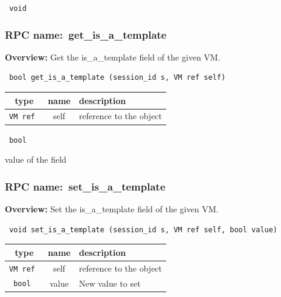 \vspace{0.3cm}

{\tt 
void
}



\vspace{0.3cm}
\vspace{0.3cm}
\vspace{0.3cm}
\subsubsection{RPC name:~get\_is\_a\_template}

{\bf Overview:} 
Get the is\_a\_template field of the given VM.

\begin{verbatim} bool get_is_a_template (session_id s, VM ref self)\end{verbatim}



 
\vspace{0.3cm}
\begin{tabular}{|c|c|p{7cm}|}
 \hline
{\bf type} & {\bf name} & {\bf description} \\ \hline
{\tt VM ref } & self & reference to the object \\ \hline 

\end{tabular}

\vspace{0.3cm}

{\tt 
bool
}


value of the field
\vspace{0.3cm}
\vspace{0.3cm}
\vspace{0.3cm}
\subsubsection{RPC name:~set\_is\_a\_template}

{\bf Overview:} 
Set the is\_a\_template field of the given VM.

\begin{verbatim} void set_is_a_template (session_id s, VM ref self, bool value)\end{verbatim}



 
\vspace{0.3cm}
\begin{tabular}{|c|c|p{7cm}|}
 \hline
{\bf type} & {\bf name} & {\bf description} \\ \hline
{\tt VM ref } & self & reference to the object \\ \hline 

{\tt bool } & value & New value to set \\ \hline 

\end{tabular}

